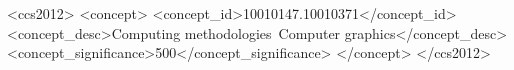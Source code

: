%
%
  
\begin{CCSXML}
<ccs2012>
<concept>
<concept_id>10010147.10010371</concept_id>
<concept_desc>Computing methodologies~Computer graphics</concept_desc>
<concept_significance>500</concept_significance>
</concept>
</ccs2012>
\end{CCSXML}


